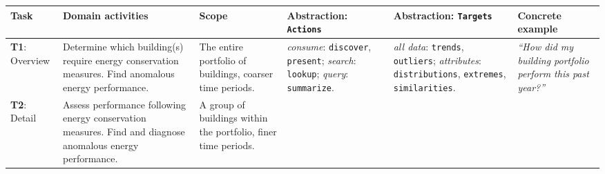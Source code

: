 \documentclass[journal]{vgtc}                %
\begin{document}
\begin{table}[ht]\renewcommand{\arraystretch}{1.2}\addtolength{\tabcolsep}{-1pt}
    \begin{center}
    \scriptsize
    \begin{tabular}{p{}|>{\RaggedRight}p{}|>{\RaggedRight}p{}|>{\RaggedRight}p{}|>{\RaggedRight}p{}|>{\RaggedRight}p{}}

        \rowcolor{nmYellow}
    
        {\bf Task} & \cellcolor{nmOrange} {\bf Domain activities} & \cellcolor{nmOrange} {\bf Scope} & {\bf Abstraction: {\tt Actions}} & {\bf Abstraction: {\tt Targets}} & {\bf Concrete example}
        
        \\
        
        \hline  
        
        \cellcolor{nmYellow} {\bf T1}: Overview 
        
        & \cellcolor{nmOrange} Determine which building(s) require energy conservation measures. Find anomalous energy performance.
        
        & \cellcolor{nmOrange} The entire portfolio of buildings, coarser time periods. 
        
        & {\it consume}: {\tt discover}, {\tt present}; {\it search}: {\tt lookup}; {\it query}: {\tt summarize}.
        
        & {\it all data}: {\tt trends}, {\tt outliers}; {\it attributes}: {\tt distributions}, {\tt extremes}, {\tt similarities}. 
        
        & {\it ``How did my building portfolio perform this past year?''}
        
        \\
        
        \hline
        
        \cellcolor{nmYellow} {\bf T2}: Detail 
        
        & \cellcolor{nmOrange} Assess performance following energy conservation measures. Find and diagnose anomalous energy performance. 
        
        & \cellcolor{nmOrange} A group of buildings within the portfolio, finer time periods.
        

\end{tabular}
\end{center}
\end{table}
\end{document}
